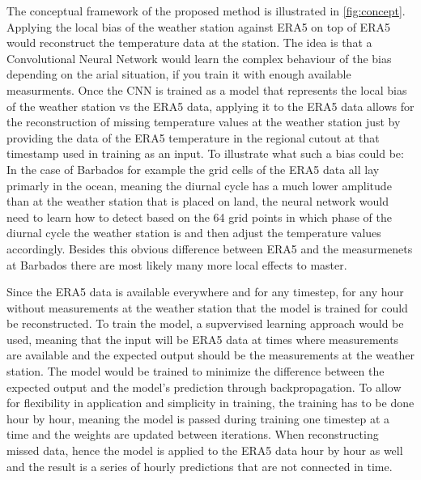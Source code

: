 The conceptual framework of the proposed method is illustrated in \autoref{fig:concept}. Applying the local bias of the weather station against ERA5 on top of ERA5 would reconstruct the temperature data at the station. The idea is that a Convolutional Neural Network would learn the complex behaviour of the bias depending on the arial situation, if you train it with enough available measurments. Once the CNN is trained as a model that represents the local bias of the weather station vs the ERA5 data, applying it to the ERA5 data allows for the reconstruction of missing temperature values at the weather station just by providing the data of the ERA5 temperature in the regional cutout at that timestamp used in training as an input. To illustrate what such a bias could be: In the case of Barbados for example the grid cells of the ERA5 data all lay primarly in the ocean, meaning the diurnal cycle has a much lower amplitude than at the weather station that is placed on land, the neural network would need to learn how to detect based on the 64 grid points in which phase of the diurnal cycle the weather station is and then adjust the temperature values accordingly. Besides this obvious difference between ERA5 and the measurmenets at Barbados there are most likely many more local effects to master.

Since the ERA5 data is available everywhere and for any timestep, for any hour without measurements at the weather station that the model is trained for could be reconstructed. To train the model, a supvervised learning approach would be used, meaning that the input will be ERA5 data at times where measurements are available and the expected output should be the measurements at the weather station. The model would be trained to minimize the difference between the expected output and the model's prediction through backpropagation. To allow for flexibility in application and simplicity in training, the training has to be done hour by hour, meaning the model is passed during training one timestep at a time and the weights are updated between iterations. When reconstructing missed data, hence the model is applied to the ERA5 data hour by hour as well and the result is a series of hourly predictions that are not connected in time.


